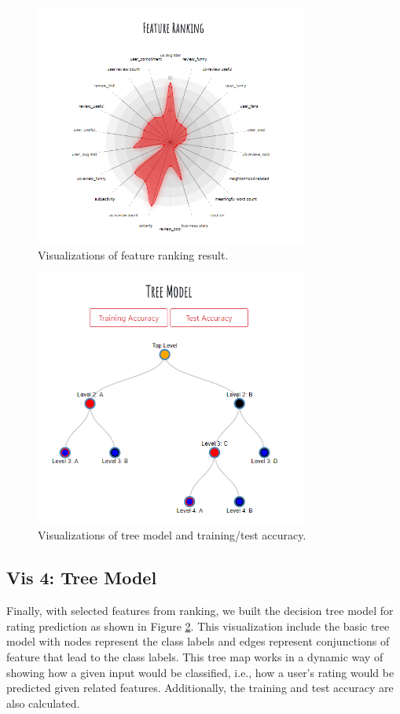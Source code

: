 \documentclass{vgtc}                          %
\begin{document}
\begin{figure}[h]
  \centering
  \includegraphics[width=9cm]{vis_3.png}
  \caption{Visualizations of feature ranking result.}
  \label{fig:vis_3}
\end{figure}

\begin{figure}[h]
  \centering
  \includegraphics[width=9cm]{vis_4.png}
  \caption{Visualizations of tree model and training/test accuracy.}
  \label{fig:vis_4}
\end{figure}

\subsection{Vis 4: Tree Model}

Finally, with selected features from ranking, we built the decision tree model for rating prediction as shown in Figure \ref{fig:vis_4}. This visualization include the basic tree model with nodes represent the class labels and edges represent conjunctions of feature that lead to the class labels. This tree map works in a dynamic way of showing how a given input would be classified, i.e., how a user's rating would be predicted given related features. Additionally, the training and test accuracy are also calculated. 
\end{document}
